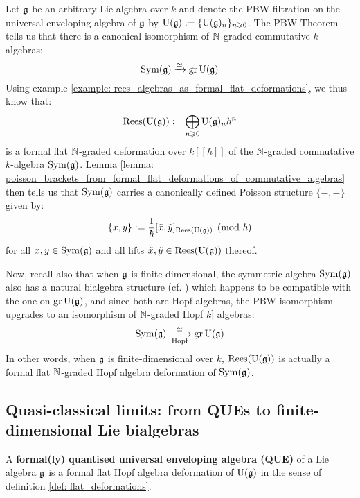             \begin{example} \label{example: PBW_deformations}
                Let $\mathfrak{g}$ be an arbitrary Lie algebra over $k$ and denote the PBW filtration on the universal enveloping algebra of $\mathfrak{g}$ by $\mathrm{U}(\mathfrak{g}) := \{\mathrm{U}(\mathfrak{g})_n\}_{n \geqslant 0}$. The PBW Theorem tells us that there is a canonical isomorphism of $\mathbb{N}$-graded commutative $k$-algebras:
                    $$\mathrm{Sym}(\mathfrak{g}) \xrightarrow[]{\simeq} \operatorname{gr} \mathrm{U}(\mathfrak{g})$$
                Using example \ref{example: rees_algebras_as_formal_flat_deformations}, we thus know that:
                    $$\operatorname{Rees}(\mathrm{U}(\mathfrak{g})) := \bigoplus_{n \geqslant 0} \mathrm{U}(\mathfrak{g})_n \hbar^n$$
                is a formal flat $\mathbb{N}$-graded deformation over $k[\![\hbar]\!]$ of the $\mathbb{N}$-graded commutative $k$-algebra $\mathrm{Sym}(\mathfrak{g})$. Lemma \ref{lemma: poisson_brackets_from_formal_flat_deformations_of_commutative_algebras} then tells us that $\mathrm{Sym}(\mathfrak{g})$ carries a canonically defined Poisson structure $\{-, -\}$ given by:
                    $$\{x, y\} := \frac{1}{\hbar}[\tilde{x}, \tilde{y}]_{\operatorname{Rees}(\mathrm{U}(\mathfrak{g}))} \pmod{\hbar}$$
                for all $x, y \in \mathrm{Sym}(\mathfrak{g})$ and all lifts $\tilde{x}, \tilde{y} \in \operatorname{Rees}(\mathrm{U}(\mathfrak{g}))$ thereof. 
    
                Now, recall also that when $\mathfrak{g}$ is finite-dimensional, the symmetric algebra $\mathrm{Sym}(\mathfrak{g})$ also has a natural bialgebra structure (cf. \cite[Chapter III]{kassel_quantum_groups}) which happens to be compatible with the one on $\operatorname{gr} \mathrm{U}(\mathfrak{g})$, and since both are Hopf algebras, the PBW isomorphism upgrades to an isomorphism of $\mathbb{N}$-graded Hopf $k$]
                algebras:
                    $$\mathrm{Sym}(\mathfrak{g}) \xrightarrow[\text{Hopf}]{\simeq} \operatorname{gr} \mathrm{U}(\mathfrak{g})$$
                In other words, when $\mathfrak{g}$ is finite-dimensional over $k$, $\operatorname{Rees}(\mathrm{U}(\mathfrak{g}))$ is actually a formal flat $\mathbb{N}$-graded Hopf algebra deformation of $\mathrm{Sym}(\mathfrak{g})$. 
            \end{example}
        
        \subsection{Quasi-classical limits: from QUEs to finite-dimensional Lie bialgebras}
            \begin{definition} \label{def: formal_QUEs}
                A \textbf{formal(ly) quantised universal enveloping algebra (QUE)} of a Lie algebra $\mathfrak{g}$ is a formal flat Hopf algebra deformation of $\mathrm{U}(\mathfrak{g})$ in the sense of definition \ref{def: flat_deformations}.
            \end{definition}
        
